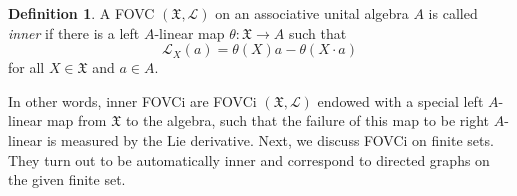 \documentclass{article}
\theoremstyle{definition}
\newtheorem{definition}[thm]{Definition}
\begin{document}
	\begin{definition}
		A FOVC $(\mathfrak{X},\mathscr{L})$ on an associative unital algebra $A$ is called \textit{inner} if there is a left $A$-linear map $\theta\colon\mathfrak{X}\to A$ such that
		\begin{equation}
			\mathscr{L}_X(a)=\theta(X)a-\theta(X\cdot a)
		\end{equation}
		for all $X\in\mathfrak{X}$ and $a\in A$.
	\end{definition}
	In other words, inner FOVCi are FOVCi $(\mathfrak{X},\mathscr{L})$ endowed with a special left $A$-linear map from $\mathfrak{X}$ to the algebra, such that the failure of this map to be right $A$-linear is measured by the Lie derivative. Next, we discuss FOVCi on finite sets. They turn out to be automatically inner and correspond to directed graphs on the given finite set.
	
\end{document}
